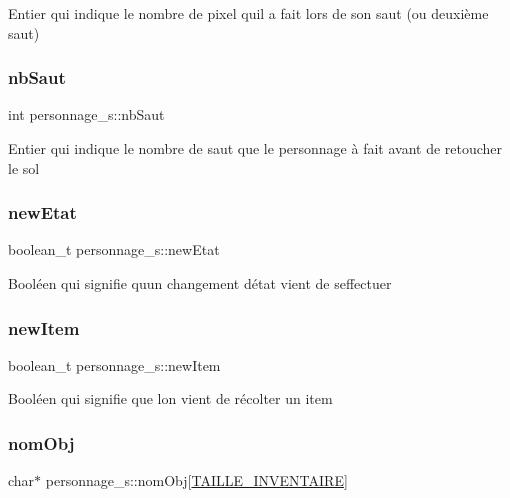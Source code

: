 Entier qui indique le nombre de pixel qu\textquotesingle{}il a fait lors de son saut (ou deuxième saut) \mbox{\label{structpersonnage__s_a1b5dac574e8ad57eaa9989699fbfb139}} 
\subsubsection{\texorpdfstring{nb\+Saut}{nbSaut}}
{\footnotesize\ttfamily int personnage\+\_\+s\+::nb\+Saut}

Entier qui indique le nombre de saut que le personnage à fait avant de retoucher le sol \mbox{\label{structpersonnage__s_ad9c2e07633c2a40855b169b4b677009f}} 
\subsubsection{\texorpdfstring{new\+Etat}{newEtat}}
{\footnotesize\ttfamily boolean\+\_\+t personnage\+\_\+s\+::new\+Etat}

Booléen qui signifie qu\textquotesingle{}un changement d\textquotesingle{}état vient de s\textquotesingle{}effectuer \mbox{\label{structpersonnage__s_a3769403f861b056206cedf16e9e21b7d}} 
\subsubsection{\texorpdfstring{new\+Item}{newItem}}
{\footnotesize\ttfamily boolean\+\_\+t personnage\+\_\+s\+::new\+Item}

Booléen qui signifie que l\textquotesingle{}on vient de récolter un item \mbox{\label{structpersonnage__s_a6fc3c82b6c4f407289aa55155876c867}} 
\subsubsection{\texorpdfstring{nom\+Obj}{nomObj}}
{\footnotesize\ttfamily char$\ast$ personnage\+\_\+s\+::nom\+Obj\mbox{[}\hyperlink{structs_8h_a5fdcc1659ee790f8bdd196e7745ab403}{T\+A\+I\+L\+L\+E\+\_\+\+I\+N\+V\+E\+N\+T\+A\+I\+RE}\mbox{]}}

